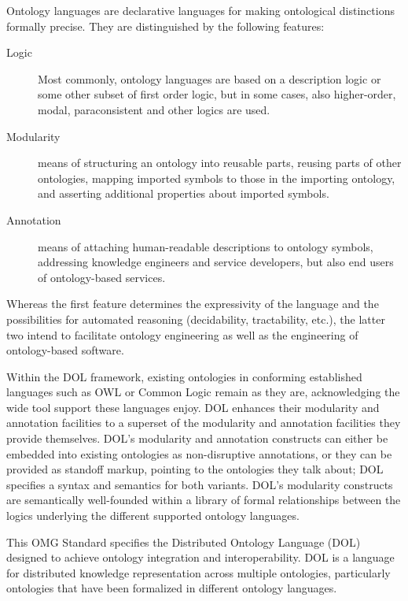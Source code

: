 \documentclass[%
\ifpretendfinal
final%
\else
draft%
\fi,
a4paper,
wd]{isov2}
\newcommand*{\IS}{OMG Standard\xspace}
\begin{document}
\begin{introduction}
Ontology languages are declarative languages for making ontological distinctions formally precise. They are distinguished by the following features:

\begin{description}
\item[Logic] Most commonly, ontology languages are based on a description logic or some other subset of first order logic, but in some cases, also higher-order, modal, paraconsistent and other logics are used.
\item[Modularity] means of structuring an ontology into reusable parts, reusing parts of other ontologies, mapping imported symbols to those in the importing ontology, and asserting additional properties about imported symbols.
\item[Annotation] means of attaching human-readable descriptions to ontology symbols, addressing knowledge engineers and service developers, but also end users of ontology-based services.
\end{description}
Whereas the first feature determines the expressivity of the language and the possibilities for automated reasoning (decidability, tractability, etc.), the latter two intend to facilitate ontology engineering as well as the engineering of ontology-based software.

Within the DOL framework, existing ontologies in conforming established languages such as OWL or Common Logic remain as they are, acknowledging the wide tool support these languages enjoy.  DOL enhances their modularity and annotation facilities to a superset of the modularity and annotation facilities they provide themselves. DOL's modularity and annotation constructs can either be embedded into existing ontologies as non-disruptive annotations, or they can be provided as standoff markup, pointing to the ontologies they talk about; DOL specifies a syntax and semantics for both variants. DOL's modularity constructs are semantically well-founded within a library of formal relationships between the logics underlying the different supported ontology languages.

\scopeclause{}

This \IS specifies the Distributed Ontology Language (DOL) designed to achieve ontology integration and interoperability. DOL is a language for distributed knowledge representation across multiple ontologies, particularly ontologies that have been formalized in different ontology languages.


\end{introduction}
\end{document}
